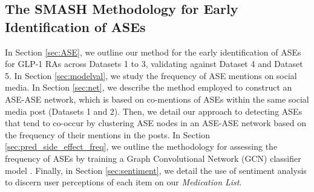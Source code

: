 \documentclass[referee,bst/sn-basic]{sn-jnl}%
\theoremstyle{thmstyletwo}%
\theoremstyle{thmstylethree}%
\begin{document}
\begin{comment}
    
\begin{table}[h]
\caption{Last update dates and side effect URLs for GLP-1 RAs}
\label{tbl:manu}
\centering
\begin{tabular}{|l|l|l|p{6cm}|}
\hline
\textbf{Drug Name} & \textbf{Brand Name} & \textbf{Last Update} & \textbf{Side Effects URL} \\
\hline
Exenatide & Byetta & 2009 & \url{https://www.accessdata.fda.gov/drugsatfda_docs/label/2009/021773s9s11s18s22s25lbl.pdf} \\
Lixisenatide & Adlyxin & 2016 & \url{https://www.accessdata.fda.gov/drugsatfda_docs/label/2016/208471orig1s000lbl.pdf} \\
Dulaglutide & Trulicity & 2017 & \url{https://www.accessdata.fda.gov/drugsatfda_docs/label/2017/125469s007s008lbl.pdf} \\
Exenatide & Bydureon & 2017 & \url{https://www.accessdata.fda.gov/drugsatfda_docs/label/2017/209210s000lbl.pdf} \\
Semaglutide & Ozempic & 2017 & \url{https://www.accessdata.fda.gov/drugsatfda_docs/label/2017/209637lbl.pdf} \\
Liraglutide & Victoza & 2019 & \url{https://www.accessdata.fda.gov/drugsatfda_docs/label/2019/022341s031lbl.pdf} \\
Semaglutide & Rybelsus & 2019 & \url{https://www.accessdata.fda.gov/drugsatfda_docs/label/2019/213051s000lbl.pdf} \\
\hline
\end{tabular}
\end{table}

\end{comment}




\subsection{The SMASH Methodology for Early Identification of ASEs}
\label{sect:methods}
In Section \ref{sec:ASE}, we outline our method for the early identification of ASEs for GLP-1 RAs across Datasets 1 to 3, validating against Dataset 4 and Dataset 5.
In Section \ref{sec:modelval}, we study the frequency of ASE mentions on social media.
In Section \ref{sec:net}, we describe the method employed to construct an ASE-ASE network, which is based on co-mentions of ASEs within the same social media post (Datasets 1 and 2). 
Then, we detail our approach to detecting ASEs that tend to co-occur by clustering ASE nodes in an ASE-ASE network based on the frequency of their mentions in the posts.
In Section \ref{sec:pred_side_effect_freq}, we outline the methodology for assessing the frequency of ASEs by training a Graph Convolutional Network (GCN) classifier model \cite{team2024pyg}.
Finally, in Section \ref{sec:sentiment}, we detail the use of sentiment analysis to discern user perceptions of each item on our \textit{Medication List}.
\end{document}

